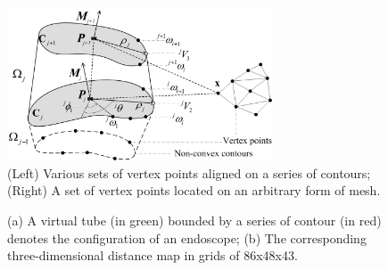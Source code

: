 \begin{figure}[ht]
\begin{center}
\includegraphics[width=0.7\textwidth]{mixed_precision/figures/pqa}
\end{center}
\caption{(Left) Various sets of vertex points aligned on a series of contours; 
(Right) A set of vertex points located on an arbitrary form of mesh.}
\label{fig:pqa}
\end{figure}

\setcounter{subfigure}{0}
\begin{figure}[t!]
\centering
{}
\caption{(a) A virtual tube (in green) bounded by a series of contour (in red) denotes the configuration of an endoscope;
(b) The corresponding three-dimensional distance map in grids of 86x48x43.}
\label{fig:tube}
\end{figure}

